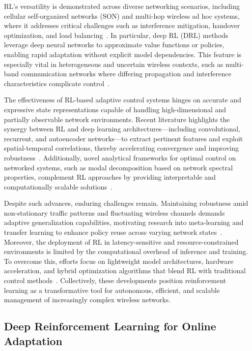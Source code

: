 \documentclass[sigconf]{acmart}
\begin{document}
RL's versatility is demonstrated across diverse networking scenarios, including cellular self-organized networks (SON) and multi-hop wireless ad hoc systems, where it addresses critical challenges such as interference mitigation, handover optimization, and load balancing~\cite{ref31,ref32,ref33,ref34,ref35}. In particular, deep RL (DRL) methods leverage deep neural networks to approximate value functions or policies, enabling rapid adaptation without explicit model dependencies. This feature is especially vital in heterogeneous and uncertain wireless contexts, such as multi-band communication networks where differing propagation and interference characteristics complicate control~\cite{ref12}.

The effectiveness of RL-based adaptive control systems hinges on accurate and expressive state representations capable of handling high-dimensional and partially observable network environments. Recent literature highlights the synergy between RL and deep learning architectures—including convolutional, recurrent, and autoencoder networks—to extract pertinent features and exploit spatial-temporal correlations, thereby accelerating convergence and improving robustness~\cite{ref31,ref2,ref50}. Additionally, novel analytical frameworks for optimal control on networked systems, such as modal decomposition based on network spectral properties, complement RL approaches by providing interpretable and computationally scalable solutions~\cite{ref32,ref34}.

Despite such advances, enduring challenges remain. Maintaining robustness amid non-stationary traffic patterns and fluctuating wireless channels demands adaptive generalization capabilities, motivating research into meta-learning and transfer learning to enhance policy reuse across varying network states~\cite{ref35}. Moreover, the deployment of RL in latency-sensitive and resource-constrained environments is limited by the computational overhead of inference and training. To overcome this, efforts focus on lightweight model architectures, hardware acceleration, and hybrid optimization algorithms that blend RL with traditional control methods~\cite{ref5,ref33}. Collectively, these developments position reinforcement learning as a transformative tool for autonomous, efficient, and scalable management of increasingly complex wireless networks.

\subsection{Deep Reinforcement Learning for Online Adaptation}
\end{document}
